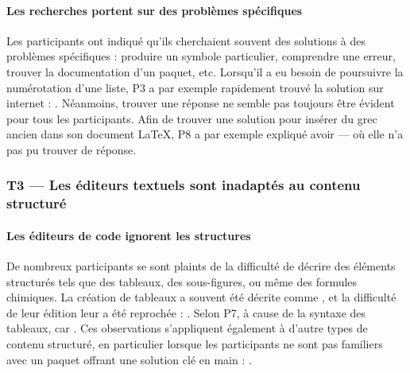 \paragraph{Les recherches portent sur des problèmes spécifiques}
Les participants ont indiqué qu'ils cherchaient souvent des solutions à des problèmes spécifiques : produire un symbole particulier, comprendre une erreur, trouver la documentation d'un paquet, etc.
Lorsqu'il a eu besoin de poursuivre la numérotation d'une liste, P3 a par exemple rapidement trouvé la solution sur internet : .
Néanmoins, trouver une réponse ne semble pas toujours être évident pour tous les participants.
Afin de trouver une solution pour insérer du grec ancien dans son document \LaTeX{}, P8 a par exemple expliqué avoir  --- où elle n'a pas pu trouver de réponse.



\subsubsection{T3 --- Les éditeurs textuels sont inadaptés au contenu structuré}

\paragraph{Les éditeurs de code ignorent les structures}
De nombreux participants se sont plaints de la difficulté de décrire des éléments structurés tels que des tableaux, des sous-figures, ou même des formules chimiques.
La création de tableaux a souvent été décrite comme , et la difficulté de leur édition leur a été reprochée : .
Selon P7, à cause de la syntaxe des tableaux,  car .
Ces observations s'appliquent également à d'autre types de contenu structuré, en particulier lorsque les participants ne sont pas familiers avec un paquet offrant une solution clé en main : .

